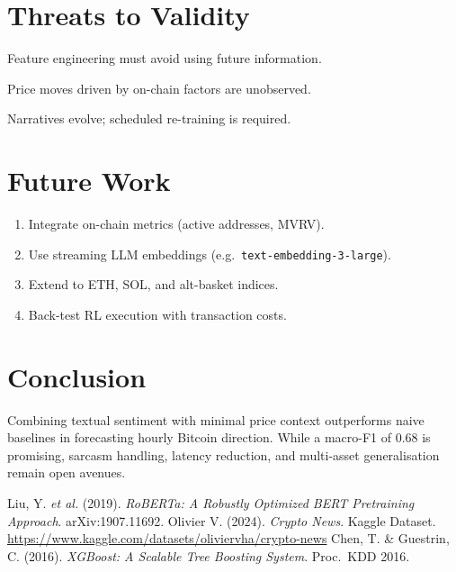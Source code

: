 \documentclass[12pt,a4paper]{article}
\begin{document}
\section{Threats to Validity}
\begin{description}[leftmargin=1.8cm,style=nextline]
\item[Look-ahead bias.]
      Feature engineering must avoid using future information.
\item[Label noise.]
      Price moves driven by on-chain factors are unobserved.
\item[Concept drift.]
      Narratives evolve; scheduled re-training is required.
\end{description}

\section{Future Work}
\begin{enumerate}[nosep]
\item Integrate on-chain metrics (active addresses, MVRV).
\item Use streaming LLM embeddings (e.g.\ \texttt{text-embedding-3-large}).
\item Extend to ETH, SOL, and alt-basket indices.
\item Back-test RL execution with transaction costs.
\end{enumerate}

\section{Conclusion}
Combining textual sentiment with minimal price context
outperforms naive baselines in forecasting hourly Bitcoin direction.
While a macro-F1 of 0.68 is promising, sarcasm handling,
latency reduction, and multi-asset generalisation remain open avenues.

\begin{thebibliography}{9}
Liu, Y. \emph{et al.} (2019).
\textit{RoBERTa: A Robustly Optimized BERT Pretraining Approach}.
arXiv:1907.11692.
Olivier V\@halde. (2024).
\textit{Crypto News}.
Kaggle Dataset.  \url{https://www.kaggle.com/datasets/oliviervha/crypto-news}
Chen, T. \& Guestrin, C. (2016).
\textit{XGBoost: A Scalable Tree Boosting System}.
Proc.\ KDD 2016.
\end{thebibliography}
\end{document}
